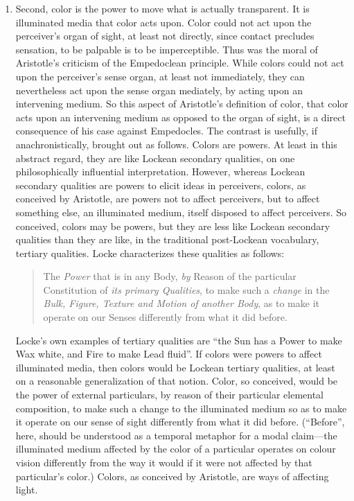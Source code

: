 \begin{enumerate}[(1)]
	\item Second, color is the power to move what is actually transparent. It is illuminated media that color acts upon. Color could not act upon the perceiver's organ of sight, at least not directly, since contact precludes sensation, to be palpable is to be imperceptible. Thus was the moral of Aristotle's criticism of the Empedoclean principle. While colors could not act upon the perceiver's sense organ, at least not immediately, they can nevertheless act upon the sense organ mediately, by acting upon an intervening medium. So this aspect of Aristotle's definition of color, that color acts upon an intervening medium as opposed to the organ of sight, is a direct consequence of his case against Empedocles. The contrast is usefully, if anachronistically, brought out as follows. Colors are powers. At least in this abstract regard, they are like Lockean secondary qualities, on one philosophically influential interpretation. However, whereas Lockean secondary qualities are powers to elicit ideas in perceivers, colors, as conceived by Aristotle, are powers not to affect perceivers, but to affect something else, an illuminated medium, itself disposed to affect perceivers. So conceived, colors may be powers, but they are less like Lockean secondary qualities than they are like, in the traditional post-Lockean vocabulary, tertiary qualities. Locke characterizes these qualities as follows: 
\begin{quote}
	The \emph{Power} that is in any Body, \emph{by} Reason of the particular Constitution of \emph{its primary Qualities}, to make such a \emph{change} in the \emph{Bulk, Figure, Texture and Motion of another Body}, as to make it operate on our Senses differently from what it did before. \citep[2.8.23]{Locke:1706hc} 
\end{quote}
Locke's \citeyearpar[2.8.23]{Locke:1706hc} own examples of tertiary qualities are ``the Sun has a Power to make Wax white, and Fire to make Lead fluid''. If colors were powers to affect illuminated media, then colors would be Lockean tertiary qualities, at least on a reasonable generalization of that notion. Color, so conceived, would be the power of external particulars, by reason of their particular elemental composition, to make such a change to the illuminated medium so as to make it operate on our sense of sight differently from what it did before. (``Before'', here, should be understood as a temporal metaphor for a modal claim---the illuminated medium affected by the color of a particular operates on colour vision differently from the way it would if it were not affected by that particular's color.) Colors, as conceived by Aristotle, are ways of affecting light.

\end{enumerate}
